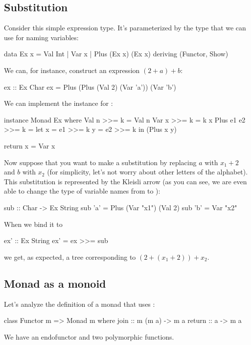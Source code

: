 \documentclass[DaoFP]{subfiles}
\begin{document}
\subsection{Substitution}

Consider this simple expression type. It's parameterized by the type  that we can use for naming variables:
\begin{haskell}
data Ex x = Val Int 
          | Var x 
          | Plus (Ex x) (Ex x) 
 deriving (Functor, Show)
\end{haskell}
We can, for instance, construct an expression $(2 + a) + b$:
\begin{haskell}
ex :: Ex Char
ex = Plus (Plus (Val 2) (Var 'a')) (Var 'b')
\end{haskell}
We can implement the  instance for :
\begin{haskell}
instance Monad Ex where
  Val n >>= k = Val n
  Var x >>= k = k x
  Plus e1 e2 >>= k = 
    let x = e1 >>= k
        y = e2 >>= k
    in (Plus x y)
    
  return x = Var x 
\end{haskell}

Now suppose that you want to make a substitution by replacing $a$ with $x_1 + 2$ and $b$ with $x_2$ (for simplicity, let's not worry about other letters of the alphabet). This substitution is represented by the Kleisli arrow  (as you can see, we are even able to change the type of variable names from  to ):
\begin{haskell}
sub :: Char -> Ex String
sub 'a' = Plus (Var "x1") (Val 2)
sub 'b' = Var "x2"
\end{haskell}
When we bind it to 
\begin{haskell}
ex' :: Ex String
ex' = ex >>= sub
\end{haskell}
we get, as expected, a tree corresponding to $(2 + (x_1 + 2)) + x_2$.

\subsection{Monad as a monoid}

Let's analyze the definition of a monad that uses :
\begin{haskell}
class Functor m => Monad m where
  join :: m (m a) -> m a
  return :: a -> m a
\end{haskell}
We have an endofunctor  and two polymorphic functions. 
\end{document}
